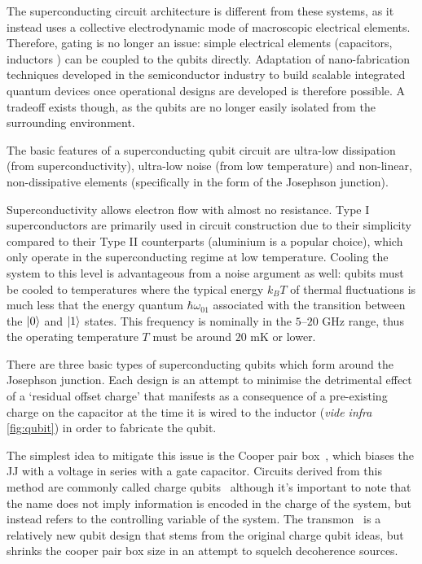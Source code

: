 The superconducting circuit architecture is different from these systems, as it instead uses a collective electrodynamic mode of macroscopic electrical elements.
Therefore, gating is no longer an issue: simple electrical elements (capacitors, inductors \etc) can be coupled to the qubits directly.
Adaptation of nano-fabrication techniques developed in the semiconductor industry to build scalable integrated quantum devices once operational designs are developed is therefore possible.
A tradeoff exists though, as the qubits are no longer easily isolated from the surrounding environment.

The basic features of a superconducting qubit circuit are ultra-low dissipation (from superconductivity), ultra-low noise (from low temperature) and non-linear, non-dissipative elements (specifically in the form of the Josephson junction).

Superconductivity allows electron flow with almost no resistance.
Type I superconductors are primarily used in circuit construction due to their simplicity compared to their Type II counterparts (aluminium is a popular choice), which only operate in the superconducting regime at low temperature.
Cooling the system to this level is advantageous from a noise argument as well: qubits must be cooled to temperatures where the typical energy $k_B T$ of thermal fluctuations is much less that the energy quantum $\hbar \omega_{01}$ associated with the transition between the $\lvert0\rangle$ and $\lvert1\rangle$ states.
This frequency is nominally in the $5$--$20$ GHz range, thus the operating temperature $T$ must be around $20$ mK or lower.

There are three basic types of superconducting qubits which form around the Josephson junction.
Each design is an attempt to minimise the detrimental effect of a `residual offset charge' that manifests as a consequence of a pre-existing charge on the capacitor at the time it is wired to the inductor (\textit{vide infra} \cref{fig:qubit}) in order to fabricate the qubit.

The simplest idea to mitigate this issue is the Cooper pair box~\cite{Nakamura1999,Bouchiat1998}, which biases the JJ with a voltage in series with a gate capacitor.
Circuits derived from this method are commonly called charge qubits~\cite{Makhlin2001,Vion2002} although it's important to note that the name does not imply information is encoded in the charge of the system, but instead refers to the controlling variable of the system.
The transmon~\cite{Wallraff2004, Schreier2008} is a relatively new qubit design that stems from the original charge qubit ideas, but shrinks the cooper pair box size in an attempt to squelch decoherence sources.

